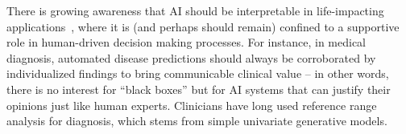 \documentclass[english]{scrartcl}
\begin{document}
There is growing awareness that AI should be interpretable in life-impacting applications~\cite{Molnar-18}, where it is (and perhaps should remain) confined to a supportive role in human-driven decision making processes. For instance, in medical diagnosis, automated disease predictions should always be corroborated by individualized findings to bring communicable clinical value -- in other words, there is no interest for ``black boxes'' but for AI systems that can justify their opinions just like human experts. Clinicians have long used reference range analysis for diagnosis, which stems from simple univariate generative models.







\end{document}

